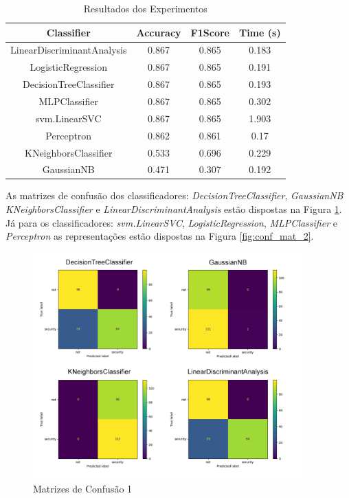 \documentclass[conference]{IEEEtran}
\begin{document}
\begin{table}[!htb]
    \centering
    \begin{tabular}{|c|c|c|c|}
        \hline
        \textbf{Classifier}        & \textbf{Accuracy} & \textbf{F1Score} & \textbf{Time (s)} \\ \hline
        LinearDiscriminantAnalysis & 0.867             & 0.865            & 0.183             \\ \hline
        LogisticRegression         & 0.867             & 0.865            & 0.191             \\ \hline
        DecisionTreeClassifier     & 0.867             & 0.865            & 0.193             \\ \hline
        MLPClassifier              & 0.867             & 0.865            & 0.302             \\ \hline
        svm.LinearSVC              & 0.867             & 0.865            & 1.903             \\ \hline
        Perceptron                 & 0.862             & 0.861            & 0.17              \\ \hline
        KNeighborsClassifier       & 0.533             & 0.696            & 0.229             \\ \hline
        GaussianNB                 & 0.471             & 0.307            & 0.192             \\ \hline
    \end{tabular}
    \vspace{0.2cm}
    \caption{Resultados dos Experimentos}
    \label{tab:resultados_experimentos}
\end{table}

As matrizes de confusão dos classificadores: \textit{DecisionTreeClassifier}, \textit{GaussianNB} \textit{KNeighborsClassifier} e \textit{LinearDiscriminantAnalysis} estão dispostas na Figura \ref{fig:conf_mat_1}. Já para os classificadores: \textit{svm.LinearSVC}, \textit{LogisticRegression}, \textit{MLPClassifier} e \textit{Perceptron} as representações estão dispostas na Figura \ref{fig:conf_mat_2}.

\begin{figure}[htbp]
    \centerline{\includegraphics[width=28em]{images/conf_mat_1.png}}
    \caption{Matrizes de Confusão 1}
    \label{fig:conf_mat_1}
\end{figure}
\end{document}
